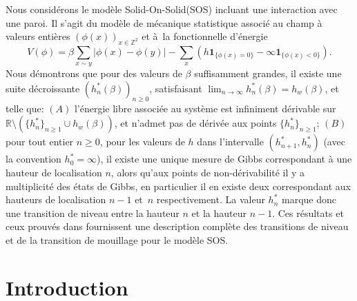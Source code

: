 \documentclass[JEP,XML,SOM,Unicode, NoFloatCountersInSection]{cedram}
\numberwithin{equation}{section}
\theoremstyle{plain}
\theoremstyle{definition}
\begin{document}
\begin{altabstract}
Nous considérons le modèle \og Solid-On-Solid\fg (SOS) incluant une interaction avec une paroi. Il s'agit du modèle de mécanique statistique associé au champ à valeurs entières $(\phi(x))_{x\in \mathbb{Z}^2}$ et à~la fonctionnelle d'énergie
\[
V(\phi)=\beta \sum_{x\sim y}|\phi(x)-\phi(y)|-\sum_{x}\left(h\mathbf{1}_{\{\phi(x)=0\}}-\infty\mathbf{1}_{\{\phi(x)<0\}} \right).
\]
Nous démontrons que pour des valeurs de $\beta$ suffisamment grandes, il existe une suite décroissante $(h^*_n(\beta))_{n\ge 0}$, satisfaisant $\lim_{n\to\infty}h^*_n(\beta)=h_w(\beta)$, et telle que: $(A)$ l'énergie libre associée au système est infiniment dérivable sur $\mathbb{R} \setminus \left(\{h^*_n\}_{n\ge 1}\cup h_w(\beta)\right)$, et n'admet pas de dérivée aux points $\{h^*_n\}_{n\ge 1}$; $(B)$ pour tout entier $n\ge 0$, pour les valeurs de $h$ dans l'intervalle $(h^*_{n+1},h^*_n)$ (avec la convention $h^*_0=\infty$), il existe une unique mesure de Gibbs correspondant à une hauteur de localisation $n$, alors qu'aux points de non-dérivabilité il y a multiplicité des états de Gibbs, en particulier il en existe deux correspondant aux hauteurs de localisation $n-1$ et~$n$ respectivement. La valeur $h^*_n$ marque donc une transition de niveau entre la hauteur $n$ et la hauteur $n-1$. Ces résultats et ceux prouvés dans {\cite{cf:part1}} fournissent une description complète des transitions de niveau et de la transition de mouillage pour le modèle SOS.
\end{altabstract}


\maketitle
\tableofcontents


\section{Introduction}
\end{document}
